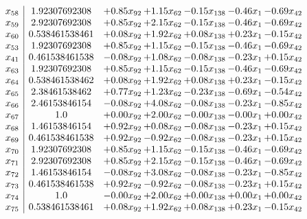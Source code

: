 \documentclass[8pt]{article}
\begin{document}
\[\begin{array}{c| c c@{\hskip 2pt} c@{\hskip 2pt} c@{\hskip 2pt} c@{\hskip 2pt} c@{\hskip 2pt} }
 x_{58}   &  1.92307692308 & +  0.85 x_{92} & +  1.15 x_{62} & -0.15 x_{138} & -0.46 x_{1} & -0.69 x_{42}\\
 x_{59}   &  2.92307692308 & +  0.85 x_{92} & +  2.15 x_{62} & -0.15 x_{138} & -0.46 x_{1} & -0.69 x_{42}\\
 x_{60}   &  0.538461538461 & +  0.08 x_{92} & +  1.92 x_{62} & +  0.08 x_{138} & +  0.23 x_{1} & -0.15 x_{42}\\
 x_{53}   &  1.92307692308 & +  0.85 x_{92} & +  1.15 x_{62} & -0.15 x_{138} & -0.46 x_{1} & -0.69 x_{42}\\
 x_{41}   &  0.461538461538 & -0.08 x_{92} & +  1.08 x_{62} & -0.08 x_{138} & -0.23 x_{1} & +  0.15 x_{42}\\
 x_{63}   &  1.92307692308 & +  0.85 x_{92} & +  1.15 x_{62} & -0.15 x_{138} & -0.46 x_{1} & -0.69 x_{42}\\
 x_{64}   &  0.538461538462 & +  0.08 x_{92} & +  1.92 x_{62} & +  0.08 x_{138} & +  0.23 x_{1} & -0.15 x_{42}\\
 x_{65}   &  2.38461538462 & +  0.77 x_{92} & +  1.23 x_{62} & -0.23 x_{138} & -0.69 x_{1} & -0.54 x_{42}\\
 x_{66}   &  2.46153846154 & -0.08 x_{92} & +  4.08 x_{62} & -0.08 x_{138} & -0.23 x_{1} & -0.85 x_{42}\\
 x_{67}   &  1.0 & +  0.00 x_{92} & +  2.00 x_{62} & -0.00 x_{138} & -0.00 x_{1} & +  0.00 x_{42}\\
 x_{68}   &  1.46153846154 & +  0.92 x_{92} & +  0.08 x_{62} & -0.08 x_{138} & -0.23 x_{1} & +  0.15 x_{42}\\
 x_{69}   &  0.461538461538 & +  0.92 x_{92} & -0.92 x_{62} & -0.08 x_{138} & -0.23 x_{1} & +  0.15 x_{42}\\
 x_{70}   &  1.92307692308 & +  0.85 x_{92} & +  1.15 x_{62} & -0.15 x_{138} & -0.46 x_{1} & -0.69 x_{42}\\
 x_{71}   &  2.92307692308 & +  0.85 x_{92} & +  2.15 x_{62} & -0.15 x_{138} & -0.46 x_{1} & -0.69 x_{42}\\
 x_{72}   &  1.46153846154 & -0.08 x_{92} & +  3.08 x_{62} & -0.08 x_{138} & -0.23 x_{1} & -0.85 x_{42}\\
 x_{73}   &  0.461538461538 & +  0.92 x_{92} & -0.92 x_{62} & -0.08 x_{138} & -0.23 x_{1} & +  0.15 x_{42}\\
 x_{74}   &  1.0 & -0.00 x_{92} & +  2.00 x_{62} & +  0.00 x_{138} & +  0.00 x_{1} & +  0.00 x_{42}\\
 x_{75}   &  0.538461538461 & +  0.08 x_{92} & +  1.92 x_{62} & +  0.08 x_{138} & +  0.23 x_{1} & -0.15 x_{42}\\

\end{array}\]
\end{document}
